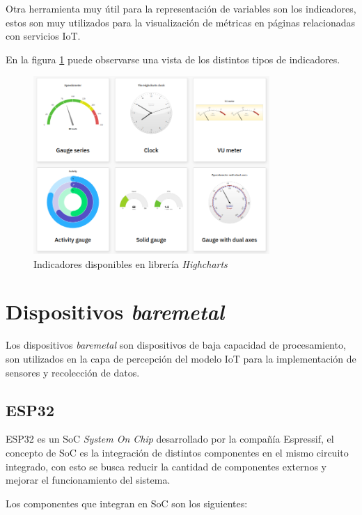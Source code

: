 Otra herramienta muy útil para la representación de variables son los indicadores, estos son muy utilizados para la visualización de métricas en páginas relacionadas con servicios IoT.

En la figura \ref{fig:highcharts2} puede observarse una vista de los distintos tipos de indicadores.

\begin{figure}[htbp]
	\centering
	\includegraphics[width=0.8\textwidth]{./Figures/highcharts2.png}
	\caption{Indicadores disponibles en librería \textit{Highcharts}}
	\label{fig:highcharts2}
\end{figure}

\section{Dispositivos \textit{baremetal}}

Los dispositivos \textit{baremetal} son dispositivos de baja capacidad de procesamiento, son utilizados en la capa de percepción del modelo IoT para la implementación de sensores y recolección de datos.

\subsection{ESP32}

ESP32 es un SoC \textit{System On Chip} desarrollado por la compañía Espressif, el concepto de SoC es la integración de distintos componentes en el mismo circuito integrado, con esto se busca reducir la cantidad de componentes externos y mejorar el funcionamiento del sistema.

Los componentes que integran en SoC son los siguientes\citep{esp}:

